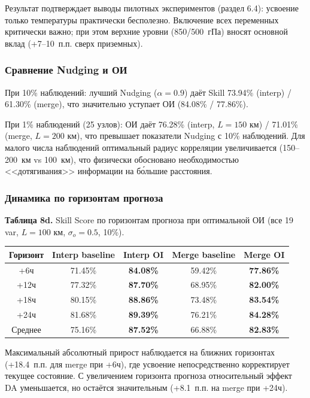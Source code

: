 \documentclass[14pt,a4paper]{extarticle}
\newcounter{none}
\numberwithin{table}{section}
\numberwithin{figure}{section}
\numberwithin{equation}{section}
\begin{document}
Результат подтверждает выводы пилотных экспериментов (раздел 6.4):
усвоение только температуры практически бесполезно. Включение всех
переменных критически важно; при этом верхние уровни (850/500~гПа)
вносят основной вклад (+7--10~п.п. сверх приземных).

\subsubsection{Сравнение Nudging и ОИ}

При 10\% наблюдений: лучший Nudging (\(\alpha = 0.9\)) даёт Skill
73.94\% (interp) / 61.30\% (merge), что значительно уступает ОИ (84.08\%
/ 77.86\%).

При 1\% наблюдений (25 узлов): ОИ даёт 76.28\% (interp, \(L = 150\) км)
/ 71.01\% (merge, \(L = 200\) км), что превышает показатели Nudging с
10\% наблюдений. Для малого числа наблюдений оптимальный радиус
корреляции увеличивается (150--200~км vs 100~км), что физически
обосновано необходимостью <<дотягивания>> информации на бо́льшие
расстояния.

\subsubsection{Динамика по горизонтам прогноза}

\textbf{Таблица 8d.} Skill Score по горизонтам прогноза при оптимальной
ОИ (все 19 var, \(L = 100\) км, \(\sigma_o = 0.5\), 10\%).

{\def\LTcaptype{none}
\begin{longtable}[]{@{}ccccc@{}}
\toprule\noalign{}
Горизонт & Interp baseline & Interp OI & Merge baseline & Merge OI \\
\midrule\noalign{}
\endhead
\bottomrule\noalign{}
\endlastfoot
+6ч & 71.45\% & \textbf{84.08\%} & 59.42\% & \textbf{77.86\%} \\
+12ч & 77.32\% & \textbf{87.70\%} & 68.95\% & \textbf{82.00\%} \\
+18ч & 80.15\% & \textbf{88.86\%} & 73.48\% & \textbf{83.54\%} \\
+24ч & 81.68\% & \textbf{89.39\%} & 76.21\% & \textbf{84.28\%} \\
Среднее & 75.16\% & \textbf{87.52\%} & 66.88\% & \textbf{82.83\%} \\
\end{longtable}
}

Максимальный абсолютный прирост наблюдается на ближних горизонтах
(+18.4~п.п. для merge при +6ч), где усвоение непосредственно корректирует
текущее состояние. С увеличением горизонта прогноза относительный эффект
DA уменьшается, но остаётся значительным (+8.1~п.п. на merge при +24ч).
\end{document}

